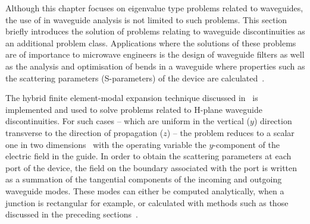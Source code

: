 Although this chapter focuses on eigenvalue type problems related to
waveguides, the use of \fenics{} in waveguide analysis is not limited
to such problems. This section briefly introduces the solution of
problems relating to waveguide discontinuities as an additional
problem class. Applications where the solutions of these problems are
of importance to microwave engineers is the design of waveguide
filters as well as the analysis and optimisation of bends in a
waveguide where properties such as the scattering parameters
(S-parameters) of the device are
calculated~\cite{Poz2005}.

The hybrid finite element-modal expansion technique discussed
in~\cite{PelCoc1998} is implemented and used to solve problems related
to H-plane waveguide discontinuities. For such cases -- which are
uniform in the vertical ($y$) direction transverse to the direction of
propagation ($z$) -- the problem reduces to a scalar one in two
dimensions~\cite{Jin2002} with the operating variable the
$y$-component of the electric field in the guide. In order to obtain
the scattering parameters at each port of the device, the field on the
boundary associated with the port is written as a summation of the
tangential components of the incoming and outgoing waveguide
modes. These modes can either be computed analytically, when a
junction is rectangular for example, or calculated with methods such
as those discussed in the preceding sections~\cite{MarPel2003}.

